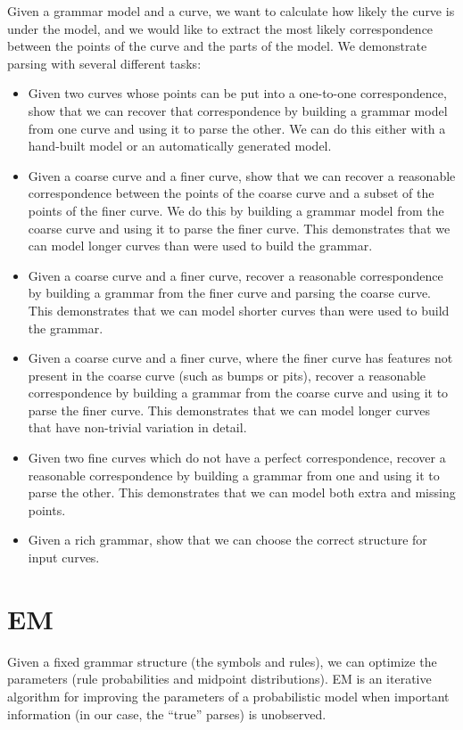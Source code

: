 \documentclass{book}
\begin{document}
Given a grammar model and a curve, we want to calculate how likely the
curve is under the model, and we would like to extract the most likely
correspondence between the points of the curve and the parts of the
model. We demonstrate parsing with several different tasks:
\begin{itemize}
\item Given two curves whose points can be put into a one-to-one
    correspondence, show that we can recover that correspondence by
    building a grammar model from one curve and using it to parse the
    other. We can do this either with a hand-built model or an
    automatically generated model.
\item Given a coarse curve and a finer curve, show that we can recover a
    reasonable correspondence between the points of the coarse curve
    and a subset of the points of the finer curve. We do this by
    building a grammar model from the coarse curve and using it to
    parse the finer curve. This demonstrates that we can model longer
    curves than were used to build the grammar.
\item Given a coarse curve and a finer curve, recover a reasonable
    correspondence by building a grammar from the finer curve and
    parsing the coarse curve. This demonstrates that we can model
    shorter curves than were used to build the grammar.
\item Given a coarse curve and a finer curve, where the finer curve has
    features not present in the coarse curve (such as bumps or pits),
    recover a reasonable correspondence by building a grammar from the
    coarse curve and using it to parse the finer curve. This
    demonstrates that we can model longer curves that have non-trivial
    variation in detail.
\item Given two fine curves which do not have a perfect correspondence,
    recover a reasonable correspondence by building a grammar from one
    and using it to parse the other. This demonstrates that we can
    model both extra and missing points.
\item Given a rich grammar, show that we can choose the correct
    structure for input curves.
\end{itemize}
\section{EM}
\label{sec-2_4}

Given a fixed grammar structure (the symbols and rules), we can
optimize the parameters (rule probabilities and midpoint
distributions). EM is an iterative algorithm for improving the
parameters of a probabilistic model when important information (in our
case, the ``true'' parses) is unobserved.
\end{document}
